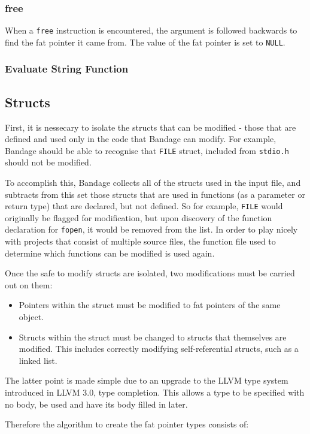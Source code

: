 \subsubsection{free}
When a \verb!free! instruction is encountered, the argument is followed backwards to find the fat pointer it came from.
The value of the fat pointer is set to \verb!NULL!.
\subsubsection{Evaluate String Function}

\subsection{Structs}

First, it is nessecary to isolate the structs that can be modified - those that are defined and used only in the code that Bandage can modify.
For example, Bandage should be able to recognise that \verb!FILE! struct, included from \verb!stdio.h! should not be modified.

To accomplish this, Bandage collects all of the structs used in the input file, and subtracts from this set those structs that are used in functions (as a parameter or return type) that are declared, but not defined.
So for example, \verb!FILE! would originally be flagged for modification, but upon discovery of the function declaration for \verb!fopen!, it would be removed from the list.
In order to play nicely with projects that consist of multiple source files, the function file used to determine which functions can be modified is used again.

Once the safe to modify structs are isolated, two modifications must be carried out on them:

\begin{itemize}
\item Pointers within the struct must be modified to fat pointers of the same object.
\item Structs within the struct must be changed to structs that themselves are modified.
This includes correctly modifying self-referential structs, such as a linked list.
\end{itemize}

The latter point is made simple due to an upgrade to the LLVM type system introduced in LLVM 3.0, type completion.
This allows a type to be specified with no body, be used and have its body filled in later.

Therefore the algorithm to create the fat pointer types consists of:

